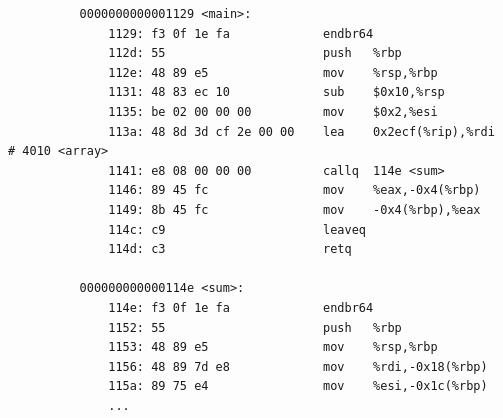 \documentclass{article}
\begin{document}
\begin{example}
\begin{lstlisting}
          0000000000001129 <main>:
              1129:	f3 0f 1e fa          	endbr64 
              112d:	55                   	push   %rbp
              112e:	48 89 e5             	mov    %rsp,%rbp
              1131:	48 83 ec 10          	sub    $0x10,%rsp
              1135:	be 02 00 00 00       	mov    $0x2,%esi
              113a:	48 8d 3d cf 2e 00 00 	lea    0x2ecf(%rip),%rdi        # 4010 <array>
              1141:	e8 08 00 00 00       	callq  114e <sum>
              1146:	89 45 fc             	mov    %eax,-0x4(%rbp)
              1149:	8b 45 fc             	mov    -0x4(%rbp),%eax
              114c:	c9                   	leaveq 
              114d:	c3                   	retq   

          000000000000114e <sum>:
              114e:	f3 0f 1e fa          	endbr64 
              1152:	55                   	push   %rbp
              1153:	48 89 e5             	mov    %rsp,%rbp
              1156:	48 89 7d e8          	mov    %rdi,-0x18(%rbp)
              115a:	89 75 e4             	mov    %esi,-0x1c(%rbp) 
              ...
        \end{lstlisting}
      \end{example}
\end{document}
